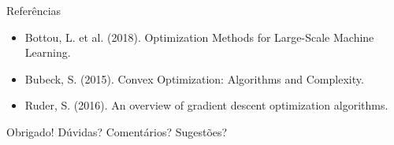 \documentclass{beamer}
\begin{document}
\begin{frame}{Refer\^encias}
\small
\begin{itemize}
    \item Bottou, L. et al. (2018). Optimization Methods for Large-Scale Machine Learning.
    \item Bubeck, S. (2015). Convex Optimization: Algorithms and Complexity.
    \item Ruder, S. (2016). An overview of gradient descent optimization algorithms.
\end{itemize}
\end{frame}

\begin{frame}{Obrigado!}
\centering
D\'uvidas? Coment\'arios? Sugest\~oes?
\end{frame}
\end{document}
